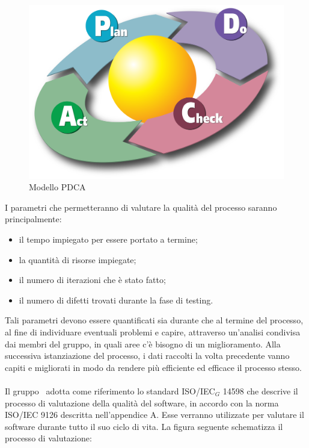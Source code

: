 \begin{figure}[h!]
	\centering
	\includegraphics[scale=.2]{img/2000px-PDCA_Cycle.png}
	\caption{Modello PDCA}
	\label{fig:ModelloPDCA}
\end{figure} 

I parametri che permetteranno di valutare la qualità del processo saranno principalmente:
\begin{itemize}
	\item il tempo impiegato per essere portato a termine; 
	\item la quantità di risorse impiegate;
	\item il numero di iterazioni che è stato fatto;
	\item il numero di difetti trovati durante la fase di testing.
\end{itemize}
Tali parametri devono essere quantificati sia durante che al termine del processo, al fine di individuare eventuali problemi e capire, attraverso un'analisi condivisa dai membri del gruppo, in quali aree c'è bisogno di un miglioramento. Alla successiva istanziazione del processo, i dati raccolti la volta precedente vanno capiti e migliorati in modo da rendere più efficiente ed efficace il processo stesso. \\ \\
Il gruppo \gruppo\ adotta come riferimento lo standard ISO/IEC$_G$ 14598 che descrive il processo di valutazione della qualità del software, in accordo con la norma ISO/IEC 9126 descritta nell'appendice A. Esse verranno utilizzate per valutare il software durante tutto il suo ciclo di vita. La figura seguente schematizza il processo di valutazione:

